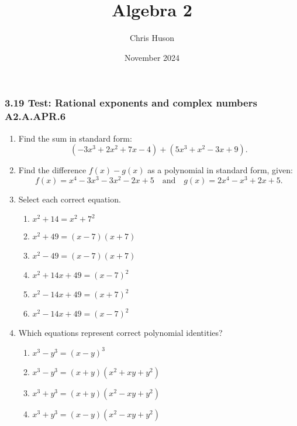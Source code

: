 \documentclass[12pt, twoside]{article}
\title{Algebra 2}
\author{Chris Huson}
\date{November 2024}
\begin{document}
\subsubsection*{3.19 Test: Rational exponents and complex numbers \hfill A2.A.APR.6}
\begin{enumerate}[itemsep=0.5cm]
\subsubsection*{A2-APR.1 Perform operations with polynomials}
\item Find the sum in standard form:
\[
(- 3x^3 + 2x^2 + 7x - 4) + (5x^3 + x^2 - 3x + 9).
\] \vspace{4cm}

\item Find the difference \(f(x) - g(x)\) as a polynomial in standard form, given:
\[
f(x) = x^4 - 3x^3 - 3x^2 - 2x + 5 \quad \text{and} \quad g(x) = 2x^4 - x^3 + 2x + 5.
\] \vspace{4cm}

\item Select each correct equation.
\begin{multicols}{2}
    \begin{enumerate}
    \item $x^2 + 14 = x^2 + 7^2$
    \item $x^2 + 49 = (x-7)(x+7)$
    \item $x^2 - 49 = (x-7)(x+7)$
    \item $x^2 + 14x + 49 = (x-7)^2$
    \item $x^2 - 14x + 49 = (x+7)^2$
    \item $x^2 - 14x + 49 = (x-7)^2$
    \end{enumerate}
\end{multicols}
        
\item Which equations represent correct polynomial identities?
\begin{multicols}{2}
    \begin{enumerate}
    \item \(x^3 - y^3 = (x - y)^3\)
    \item \(x^3 - y^3 = (x + y)(x^2 + xy + y^2)\)
    \item \(x^3 + y^3 = (x + y)(x^2 - xy + y^2)\)
    \item \(x^3 + y^3 = (x - y)(x^2 - xy + y^2)\)
\end{enumerate}
\end{multicols}
    

\end{enumerate}
\end{document}
